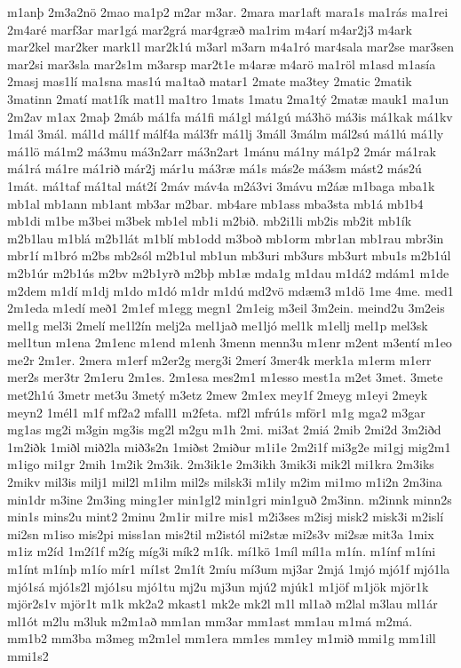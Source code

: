 {m1anþ
2m3a2nö
2mao
ma1p2
m2ar
m3ar.
2mara
mar1aft
mara1s
ma1rás
ma1rei
2m4aré
marf3ar
mar1gá
mar2grá
mar4græð
ma1rim
m4arí
m4ar2j3
m4ark
mar2kel
mar2ker
mark1l
mar2k1ú
m3arl
m3arn
m4a1ró
mar4sala
mar2se
mar3sen
mar2si
mar3sla
mar2s1m
m3arsp
mar2t1e
m4aræ
m4arö
ma1röl
m1asd
m1asía
2masj
mas1lí
ma1sna
mas1ú
ma1tað
matar1
2mate
ma3tey
2matic
2matik
3matinn
2matí
mat1ík
mat1l
ma1tro
1mats
1matu
2ma1tý
2matæ
mauk1
ma1un
2m2av
m1ax
2maþ
2máb
má1fa
má1fi
má1gl
má1gú
má3hö
má3is
má1kak
má1kv
1mál
3mál.
mál1d
mál1f
málf4a
mál3fr
má1lj
3máll
3málm
mál2sú
má1lú
má1ly
má1lö
má1m2
má3mu
má3n2arr
má3n2art
1mánu
má1ny
má1p2
2már
má1rak
má1rá
má1re
má1rið
már2j
már1u
má3ræ
má1s
más2e
má3sm
mást2
más2ú
1mát.
má1taf
má1tal
mát2í
2máv
máv4a
m2á3vi
3mávu
m2áæ
m1baga
mba1k
mb1al
mb1ann
mb1ant
mb3ar
m2bar.
mb4are
mb1ass
mba3sta
mb1á
mb1b4
mb1di
m1be
m3bei
m3bek
mb1el
mb1i
m2bið.
mb2i1li
mb2is
mb2it
mb1ík
m2b1lau
m1blá
m2b1lát
m1blí
mb1odd
m3boð
mb1orm
mbr1an
mb1rau
mbr3in
mbr1í
m1bró
m2bs
mb2sól
m2b1ul
mb1un
mb3uri
mb3urs
mb3urt
mbu1s
m2b1úl
m2b1úr
m2b1ús
m2bv
m2b1yrð
m2bþ
mb1æ
mda1g
m1dau
m1dá2
mdám1
m1de
m2dem
m1dí
m1dj
m1do
m1dó
m1dr
m1dú
md2vö
mdæm3
m1dö
1me
4me.
med1
2m1eda
m1edí
með1
2m1ef
m1egg
megn1
2m1eig
m3eil
3m2ein.
meind2u
3m2eis
mel1g
mel3i
2melí
me1l2ín
melj2a
mel1jað
me1ljó
mel1k
m1ellj
mel1p
mel3sk
mel1tun
m1ena
2m1enc
m1end
m1enh
3menn
menn3u
m1enr
m2ent
m3entí
m1eo
me2r
2m1er.
2mera
m1erf
m2er2g
merg3i
2merí
3mer4k
merk1a
m1erm
m1err
mer2s
mer3tr
2m1eru
2m1es.
2m1esa
mes2m1
m1esso
mest1a
m2et
3met.
3mete
met2h1ú
3metr
met3u
3metý
m3etz
2mew
2m1ex
mey1f
2meyg
m1eyi
2meyk
meyn2
1mél1
m1f
mf2a2
mfall1
m2feta.
mf2l
mfrú1s
mför1
m1g
mga2
m3gar
mg1as
mg2i
m3gin
mg3is
mg2l
m2gu
m1h
2mi.
mi3at
2miá
2mib
2mi2d
3m2iðd
1m2iðk
1miðl
mið2la
mið3s2n
1miðst
2miður
m1i1e
2m2i1f
mi3g2e
mi1gj
mig2m1
m1igo
mi1gr
2mih
1m2ik
2m3ik.
2m3ik1e
2m3ikh
3mik3i
mik2l
mi1kra
2m3iks
2mikv
mil3is
milj1
mil2l
m1ilm
mil2s
milsk3i
m1ily
m2im
mi1mo
m1i2n
2m3ina
min1dr
m3ine
2m3ing
ming1er
min1gl2
min1gri
min1guð
2m3inn.
m2innk
minn2s
min1s
mins2u
mint2
2minu
2m1ir
mi1re
mis1
m2i3ses
m2isj
misk2
misk3i
m2islí
mi2sn
m1iso
mis2pi
miss1an
mis2til
m2istól
mi2stæ
mi2s3v
mi2sæ
mit3a
1mix
m1iz
m2íd
1m2í1f
m2íg
míg3i
mík2
m1ík.
mí1kö
1míl
míl1a
m1ín.
m1ínf
m1íni
m1ínt
m1ínþ
m1ío
mír1
mí1st
2m1ít
2míu
mí3um
mj3ar
2mjá
1mjó
mjó1f
mjó1la
mjó1sá
mjó1s2l
mjó1su
mjó1tu
mj2u
mj3un
mjú2
mjúk1
m1jöf
m1jök
mjör1k
mjör2s1v
mjör1t
m1k
mk2a2
mkast1
mk2e
mk2l
m1l
ml1að
m2lal
m3lau
ml1ár
ml1ót
m2lu
m3luk
m2m1að
mm1an
mm3ar
mm1ast
mm1au
m1má
m2má.
mm1b2
mm3ba
m3meg
m2m1el
mm1era
mm1es
mm1ey
m1mið
mmi1g
mm1ill
mmi1s2
}

